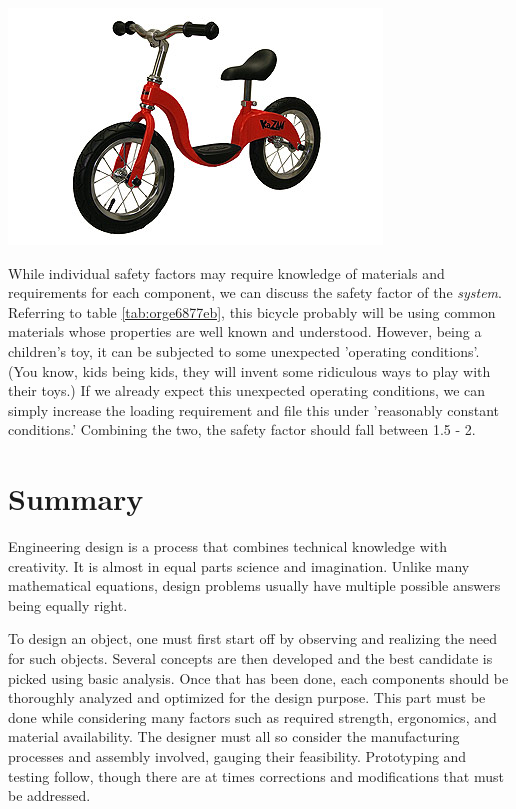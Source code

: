 \documentclass[a4paper,openany,12pt]{book}
\begin{document}
\begin{center}
\includegraphics[width=.9\linewidth]{pictures/intro-eng-design/balance-bike.jpg}
\end{center}

While individual safety factors may require knowledge of materials and
requirements for each component, we can discuss the safety factor of the
\emph{system}. Referring to table \ref{tab:orge6877eb},
this bicycle probably will be using common materials whose properties
are well known and understood. However, being a children's toy, it can
be subjected to some unexpected 'operating conditions'. (You know, kids
being kids, they will invent some ridiculous ways to play with their
toys.) If we already expect this unexpected operating conditions, we can
simply increase the loading requirement and file this under 'reasonably
constant conditions.' Combining the two, the safety factor should fall
between 1.5 - 2.

\section{Summary}
\label{sec:org1dde4c8}
Engineering design is a process that combines technical knowledge with
creativity. It is almost in equal parts science and imagination. Unlike
many mathematical equations, design problems usually have multiple
possible answers being equally right.

To design an object, one must first start off by observing and realizing
the need for such objects. Several concepts are then developed and the
best candidate is picked using basic analysis. Once that has been done,
each components should be thoroughly analyzed and optimized for the
design purpose. This part must be done while considering many factors
such as required strength, ergonomics, and material availability. The
designer must all so consider the manufacturing processes and assembly
involved, gauging their feasibility. Prototyping and testing follow,
though there are at times corrections and modifications that must be
addressed.
\end{document}
